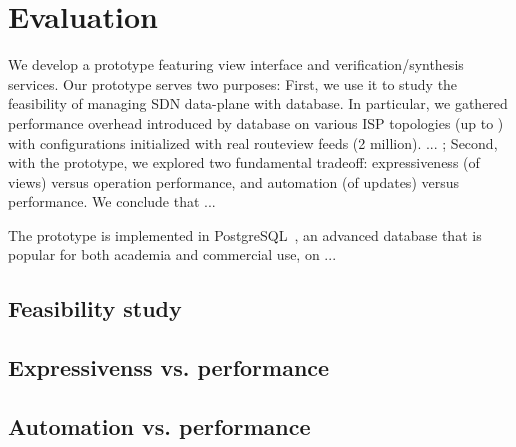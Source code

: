 \section{Evaluation}
\label{sec:eval}


We develop a prototype featuring view interface and
verification/synthesis services. Our prototype serves two purposes:
First, we use it to study the feasibility of managing SDN data-plane
with database. In particular, we gathered performance overhead
introduced by database on various ISP topologies (up to ) with
configurations initialized with real routeview feeds (2
million). ... ; Second, with the prototype, we explored two
fundamental tradeoff: expressiveness (of views) versus operation
performance, and automation (of updates) versus performance. We
conclude that ...

The prototype is implemented in PostgreSQL~\cite{postgres}, an
advanced database that is popular for both academia and commercial
use, on ... %

\subsection{Feasibility study}

\subsection{Expressivenss vs. performance}

\subsection{Automation vs. performance}




% 

